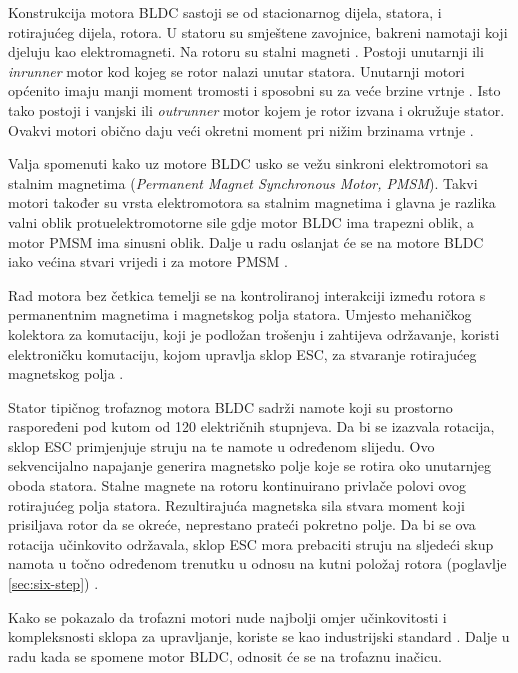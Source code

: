 \documentclass[diplomskirad]{fer}
\begin{document}
Konstrukcija motora BLDC sastoji se od stacionarnog dijela, statora, i
rotirajućeg dijela, rotora. U statoru su smještene zavojnice, bakreni namotaji
koji djeluju kao elektromagneti. Na rotoru su stalni magneti
\cite{elektromotor-beskolektorski}. Postoji unutarnji ili \textit{ inrunner }
motor kod kojeg se rotor nalazi unutar statora. Unutarnji motori općenito imaju
manji moment tromosti i sposobni su za veće brzine vrtnje \cite{cite:bldc}.
Isto tako postoji i vanjski ili \textit{ outrunner } motor kojem je rotor
izvana i okružuje stator. Ovakvi motori obično daju veći okretni moment pri
nižim brzinama vrtnje \cite{cite:bldc}.


Valja spomenuti kako uz motore BLDC usko se vežu sinkroni elektromotori sa
stalnim magnetima (\textit{Permanent Magnet Synchronous Motor, PMSM}). Takvi
motori također su vrsta elektromotora sa stalnim magnetima i glavna je razlika
valni oblik protuelektromotorne sile gdje motor BLDC ima trapezni oblik, a
motor PMSM ima sinusni oblik. Dalje u radu oslanjat će se na motore BLDC iako
većina stvari vrijedi i za motore PMSM
\cite{elektromotor-sa-stalnim-magnetima}.

Rad motora bez četkica temelji se na kontroliranoj interakciji između rotora s
permanentnim magnetima i magnetskog polja statora. Umjesto mehaničkog kolektora
za komutaciju, koji je podložan trošenju i zahtijeva održavanje, koristi
elektroničku komutaciju, kojom upravlja sklop ESC, za stvaranje rotirajućeg
magnetskog polja \cite{cite:disertacija}.

Stator tipičnog trofaznog motora BLDC sadrži namote koji su prostorno
raspoređeni pod kutom od 120 električnih stupnjeva. Da bi se izazvala rotacija,
sklop ESC primjenjuje struju na te namote u određenom slijedu. Ovo
sekvencijalno napajanje generira magnetsko polje koje se rotira oko unutarnjeg
oboda statora. Stalne magnete na rotoru kontinuirano privlače polovi ovog
rotirajućeg polja statora. Rezultirajuća magnetska sila stvara moment koji
prisiljava rotor da se okreće, neprestano prateći pokretno polje. Da bi se ova
rotacija učinkovito održavala, sklop ESC mora prebaciti struju na sljedeći skup
namota u točno određenom trenutku u odnosu na kutni položaj rotora (poglavlje
\ref{sec:six-step}) \cite{MicrochipAN885}. 

Kako se pokazalo da trofazni motori nude najbolji omjer učinkovitosti i
kompleksnosti sklopa za upravljanje, koriste se kao industrijski standard
\cite{cite:trofazni}. Dalje u radu kada se spomene motor BLDC, odnosit će se na
trofaznu inačicu.
\end{document}
